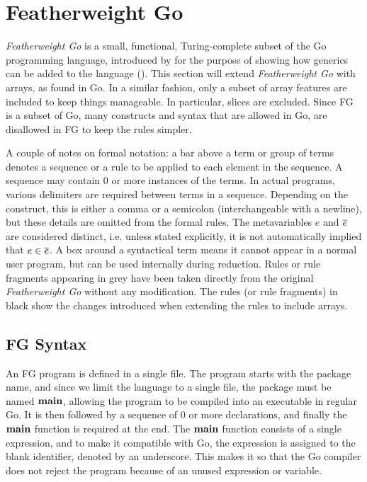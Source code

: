 \section{Featherweight Go}

\emph{Featherweight Go} is a small, functional, Turing-complete subset of the Go
programming language, introduced by \citeauthor{fg} for the purpose of showing
how generics can be added to the language (\citeyear{fg}). This section will
extend \emph{Featherweight Go} with arrays, as found in Go. In a similar
fashion, only a subset of array features are included to keep things manageable.
In particular, slices are excluded. Since FG is a subset of Go, many constructs
and syntax that are allowed in Go, are disallowed in FG to keep the rules
simpler.

A couple of notes on formal notation: a bar above a term or group of terms
denotes a sequence or a rule to be applied to each element in the sequence. A
sequence may contain 0 or more instances of the terms. In actual programs,
various delimiters are required between terms in a sequence. Depending on the
construct, this is either a comma or a semicolon (interchangeable with a
newline), but these details are omitted from the formal rules. The metavariables
$e$ and $\overline{e}$ are considered distinct, i.e. unless stated explicitly, it is
not automatically implied that $e \in \overline{e}$. A box around a syntactical term
means it cannot appear in a normal user program, but can be used internally
during reduction. Rules or rule fragments appearing in grey have been taken
directly from the original \emph{Featherweight Go} \autocite{fg} without any
modification. The rules (or rule fragments) in black show the changes introduced
when extending the rules to include arrays.

\subsection{FG Syntax}

An FG program is defined in a single file. The program starts with the package
name, and since we limit the language to a single file, the package must be
named $\texttt{\bf main}$, allowing the program to be compiled into an executable in regular
Go. It is then followed by a sequence of 0 or more declarations, and finally the
$\texttt{\bf main}$ function is required at the end. The $\texttt{\bf main}$ function consists of a
single expression, and to make it compatible with Go, the expression is assigned
to the blank identifier, denoted by an underscore. This makes it so that the Go
compiler does not reject the program because of an unused expression or
variable.

